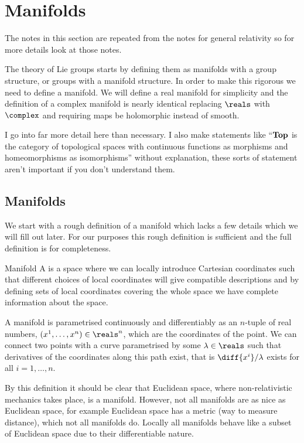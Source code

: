 \chapter{Manifolds}\label{app:manifold}
\begin{rmk}
    The notes in this section are repeated from the notes for general relativity so for more details look at those notes.
\end{rmk}
The theory of Lie groups starts by defining them as manifolds with a group structure, or groups with a manifold structure.
In order to make this rigorous we need to define a manifold.
We will define a real manifold for simplicity and the definition of a complex manifold is nearly identical replacing \(\reals\) with \(\complex\) and requiring maps be holomorphic instead of smooth.

I go into far more detail here than necessary.
I also make statements like \enquote{\(\mathbf{Top}\) is the category of topological spaces with continuous functions as morphisms and homeomorphisms as isomorphisms} without explanation, these sorts of statement aren't important if you don't understand them.

\section{Manifolds}
We start with a rough definition of a manifold which lacks a few details which we will fill out later.
For our purposes this rough definition is sufficient and the full definition is for completeness.
\begin{dfn}{Manifold}{}
    A  is a space where we can locally introduce Cartesian coordinates such that different choices of local coordinates will give compatible descriptions and by defining sets of local coordinates covering the whole space we have complete information about the space.
\end{dfn}

A manifold is parametrised continuously and differentiably as an \(n\)-tuple of real numbers, \((x^1, \dotsc, x^n) \in \reals^n\), which are the coordinates of the point.
We can connect two points with a curve parametrised by some \(\lambda \in \reals\) such that derivatives of the coordinates along this path exist, that is \(\diff{x^i}/{\lambda}\) exists for all \(i = 1, \dotsc, n\).

By this definition it should be clear that Euclidean space, where non-relativistic mechanics takes place, is a manifold.
However, not all manifolds are as nice as Euclidean space, for example Euclidean space has a metric (way to measure distance), which not all manifolds do.
Locally all manifolds behave like a subset of Euclidean space due to their differentiable nature.

